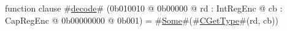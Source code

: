 function clause #\hyperref[zdecode]{decode}# (0b010010 @ 0b00000 @ rd : IntRegEnc @ cb : CapRegEnc @ 0b00000000 @ 0b001) = #\hyperref[zSome]{Some}#(#\hyperref[zCGetType]{CGetType}#(rd, cb))
